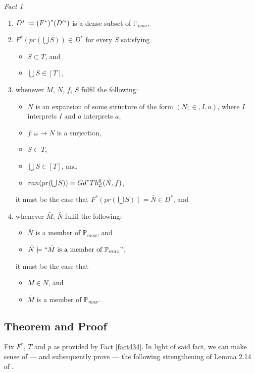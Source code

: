 \documentclass[12pt, twoside]{memoir}
\numberwithin{equation}{section}
\theoremstyle{definition}
\theoremstyle{remark}
\newtheorem{fact}[thm]{Fact}
\theoremstyle{definition}
\theoremstyle{definition}
\theoremstyle{definition}
\theoremstyle{remark}
\begin{document}
\begin{fact}
\begin{enumerate}[label=(4.34.\arabic*), leftmargin=50pt]
    \item\label{4344} $D^* := (F^*) " (D'^*)$ is a dense subset of $\mathbb{P}_{max}$, 
    \item\label{4345} $F^*(pr(\bigcup S)) \in D^*$ for every $S$ satisfying
    \begin{itemize}
        \item $S \subset T$, and
        \item $\bigcup S \in [T]$, 
    \end{itemize}
    \item\label{4346b} whenever $\bar{M}$, $\bar{N}$, $f$, $S$ fulfil the following:
    \begin{itemize}
        \item $\bar{N}$ is an expansion of some structure of the form $(N; \in, I, a)$, where $I$ interprets $\dot{I}$ and $a$ interprets $\dot{a}$,
        \item $f : \omega \longrightarrow N$ is a surjection,
        \item $S \subset T$,
        \item $\bigcup S \in [T]$, and
        \item $ran(pr(\bigcup S)) = Gd" Th^0_{\mathcal{L}}(\bar{N}, f)$,
    \end{itemize}
    it must be the case that $F^*(pr(\bigcup S)) = \bar{N} \in D^*$, and
    \item\label{4346} whenever $\bar{M}$, $\bar{N}$ fulfil the following:
    \begin{itemize}
        \item $\bar{N}$ is a member of $\mathbb{P}_{max}$, and
        \item $\bar{N} \models ``\bar{M} \text{ is a member of } \mathbb{P}_{max}"$,
    \end{itemize}
    it must be the case that
    \begin{itemize}
        \item $\bar{M} \in \bar{N}$, and
        \item $\bar{M}$ is a member of $\mathbb{P}_{max}$.
    \end{itemize}
\end{enumerate}
\end{fact}

\subsection{Theorem and Proof}

Fix $F^*$, $T$ and $\dot{p}$ as provided by Fact \ref{fact434}. In light of said fact, we can make sense of --- and subsequently prove --- the following strengthening of Lemma 2.14 of \cite{schindler}.
\end{document}
